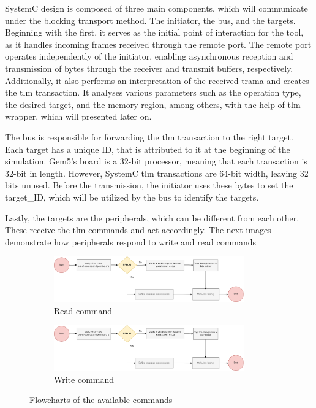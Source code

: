 SystemC design is composed of three main components, which will communicate under the blocking transport method. 
The initiator, the bus, and the targets.
Beginning with the first, it serves as the initial 
point of interaction for the tool, as it handles incoming frames received through the remote port. The remote port operates independently 
of the initiator, enabling asynchronous reception and transmission of bytes through the receiver and transmit buffers, respectively.
Additionally, it also performs an interpretation of the received trama and creates the \gls{tlm} transaction. It analyses various 
parameters such as the operation type, the desired target, and the memory region, among others, with the help of \gls{tlm} wrapper, 
which will presented later on.

The bus is responsible for forwarding the \gls{tlm} transaction to the right target. Each target has a unique ID, that is attributed to it 
at the beginning of the simulation. Gem5's board is a 32-bit processor, meaning that each transaction is 32-bit in length. However, SystemC 
\gls{tlm} transactions are 64-bit width, leaving 32 bits unused. Before the transmission, the initiator uses these bytes to set the 
target\_ID, which will be utilized by the bus to identify the targets.

Lastly, the targets are the peripherals, which can be different from each other. These receive the 
\gls{tlm} commands and act accordingly. The next images demonstrate how peripherals respond to write and read commands 

\begin{figure}[H]
	\centering
	\begin{subfigure}{\textwidth}
		\centering
		\includegraphics[width=0.9\textwidth]{Images/CoSimReadOperation.png}
 		\caption[1\textwidth]{Read command}
	\end{subfigure}
	\begin{subfigure}{\textwidth}
		\centering
		\includegraphics[width=0.9\textwidth]{Images/CoSimWriteOperation.png}
		\caption[1\textwidth]{Write command}
	\end{subfigure}
		
	\caption{Flowcharts of the available commands}
\end{figure}

